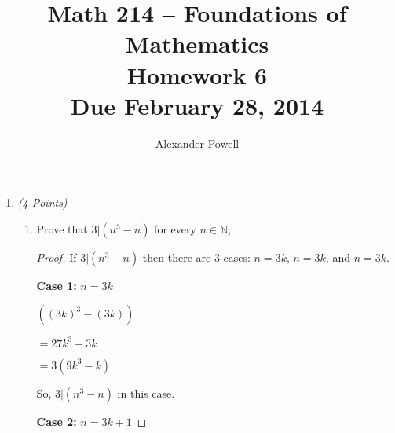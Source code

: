 \documentclass[10pt]{article} %
\title{Math 214 -- Foundations of Mathematics\\
Homework 6\\
{\large{\bf Due February 28, 2014}}}
\date{}
\author{Alexander Powell}
\newcommand{\N}{\mathbb{N}}
\newcommand{\points}[1]{{\it (#1 Points)}}
\begin{document}
\maketitle



\begin{enumerate}





\item\points{4} \begin{enumerate}

                    \item Prove that $3|(n^3-n)$ for every  $n\in \N$;
                    
                    \bigskip
                    
                    \begin{proof}If $3|(n^3-n)$ then there are $3$ cases: $n = 3k$, $n = 3k$, and $n = 3k$.  
                    
                    {\bf Case 1:} $n = 3k$
                    
                    $((3k)^3 - (3k))$
                    
                    $ = 27k^3 - 3k$
                    
                    $ = 3(9k^3 - k)$
                    
                    So, $3|(n^3-n)$ in this case.  
                    
                    {\bf Case 2:} $n = 3k + 1$
                    

\end{proof}
\end{enumerate}
\end{enumerate}
\end{document}
